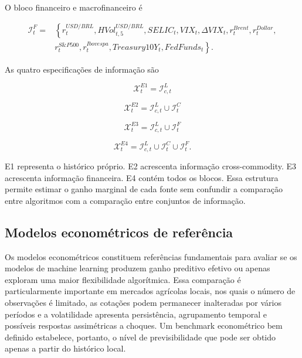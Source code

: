 \documentclass[a4paper,fleqn]{cas-sc}
\begin{document}
O bloco financeiro e macrofinanceiro é

\begin{equation}
\begin{aligned}
\mathcal{I}^{F}_{t}
={}&\left\{
r^{USD/BRL}_{t},HVol^{USD/BRL}_{t,5},
SELIC_{t},VIX_{t},\Delta VIX_{t},
r^{Brent}_{t},r^{Dollar}_{t}, \right.\\
&\left. r^{S\&P500}_{t},r^{Ibovespa}_{t},
Treasury10Y_{t},FedFunds_{t}
\right\}.
\end{aligned}
\label{eq:financial_info}
\end{equation}

As quatro especificações de informação são

\begin{equation}
\mathcal{X}^{E1}_{t}=\mathcal{I}^{L}_{c,t}
\label{eq:e1}
\end{equation}

\begin{equation}
\mathcal{X}^{E2}_{t}=\mathcal{I}^{L}_{c,t}\cup\mathcal{I}^{C}_{t}
\label{eq:e2}
\end{equation}

\begin{equation}
\mathcal{X}^{E3}_{t}=\mathcal{I}^{L}_{c,t}\cup\mathcal{I}^{F}_{t}
\label{eq:e3}
\end{equation}

\begin{equation}
\mathcal{X}^{E4}_{t}=\mathcal{I}^{L}_{c,t}\cup\mathcal{I}^{C}_{t}\cup\mathcal{I}^{F}_{t}.
\label{eq:e4}
\end{equation}

E1 representa o histórico próprio. E2 acrescenta informação cross-commodity. E3 acrescenta informação financeira. E4 contém todos os blocos. Essa estrutura permite estimar o ganho marginal de cada fonte sem confundir a comparação entre algoritmos com a comparação entre conjuntos de informação.

\subsection{Modelos econométricos de referência}
\label{subsec:econometric_models}

Os modelos econométricos constituem referências fundamentais para avaliar se os modelos de machine learning produzem ganho preditivo efetivo ou apenas exploram uma maior flexibilidade algorítmica. Essa comparação é particularmente importante em mercados agrícolas locais, nos quais o número de observações é limitado, as cotações podem permanecer inalteradas por vários períodos e a volatilidade apresenta persistência, agrupamento temporal e possíveis respostas assimétricas a choques. Um benchmark econométrico bem definido estabelece, portanto, o nível de previsibilidade que pode ser obtido apenas a partir do histórico local.
\end{document}
